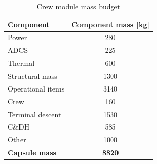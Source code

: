 \begin{table}[h]
\centering
\caption{Crew module mass budget}
\label{tab:crewmass}
\begin{tabular}{|l|c|}
\hline
{\bf Component}    & {\bf Component mass {[}kg{]}} \\ \hline \hline
Power              & 280                           \\ \hline
 ADCS        &  225                     \\ \hline
Thermal            & 600                           \\ \hline
Structural mass    & 1300                          \\ \hline
Operational items  & 3140                          \\ \hline
Crew               & 160                           \\ \hline
Terminal descent   & 1530                          \\ \hline
C\&DH              & 585                           \\ \hline 
Other    & 1000                          \\ \hline \hline
{\bf Capsule mass} & {\bf 8820}                    \\ \hline
\end{tabular}
\end{table}


